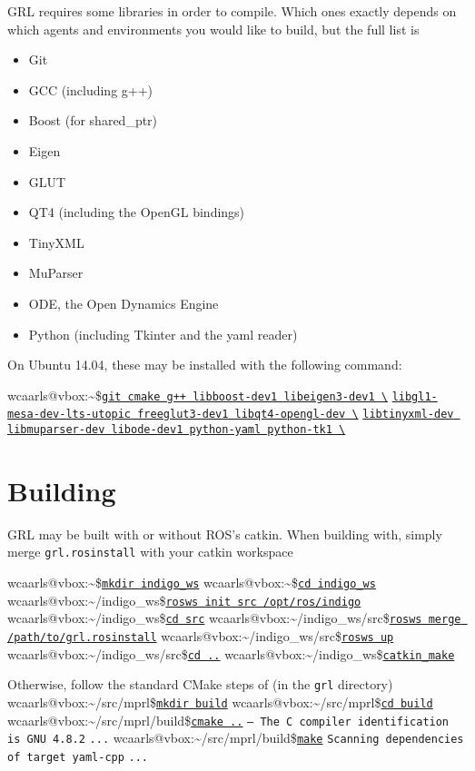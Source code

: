 \documentclass{article}
\makeatletter
\newcommand{\inp}[1]{\texttt{\underline{#1}}}
\newcommand{\txt}[1]{\texttt{#1}}
\newcommand{\promptm}{wcaarls@vbox:\~{}/src/mprl\$\xspace}
\newcommand{\promptmb}{wcaarls@vbox:\~{}/src/mprl/build\$\xspace}
\newcommand{\prompt}{wcaarls@vbox:\~{}\$\xspace}
\newcommand{\prompth}{wcaarls@vbox:\~{}/indigo\_ws\$\xspace}
\newcommand{\prompths}{wcaarls@vbox:\~{}/indigo\_ws/src\$\xspace}
\newenvironment{code}{\alltt}{\endalltt}
\makeatother
\begin{document}
GRL requires some libraries in order to compile. Which ones exactly depends
on which agents and environments you would like to build, but the full list
is

\begin{itemize}
  \item Git
  \item GCC (including g++)
  \item Boost (for shared\_ptr)
  \item Eigen
  \item GLUT
  \item QT4 (including the OpenGL bindings)
  \item TinyXML
  \item MuParser
  \item ODE, the Open Dynamics Engine
  \item Python (including Tkinter and the yaml reader)
\end{itemize}

On Ubuntu 14.04, these may be installed with the following command:

\begin{code}
\prompt \inp{git cmake g++ libboost-dev1 libeigen3-dev1 \textbackslash}
\inp{libgl1-mesa-dev-lts-utopic freeglut3-dev1 libqt4-opengl-dev \textbackslash}
\inp{libtinyxml-dev libmuparser-dev libode-dev1 python-yaml python-tk1 \textbackslash}
\end{code}

\section{Building}

GRL may be built with or without ROS's catkin. When building with, simply
merge \txt{grl.rosinstall} with your catkin workspace

\begin{code}
{\color{Gray}\prompt \inp{mkdir indigo\_ws}
\prompt \inp{cd indigo\_ws}
\prompth \inp{rosws init src /opt/ros/indigo}
\prompth \inp{cd src}}
\prompths \inp{rosws merge /path/to/grl.rosinstall} 
\prompths \inp{rosws up}
\prompths \inp{cd ..}
\prompth \inp{catkin\_make}
\end{code}

Otherwise, follow the standard CMake steps of (in the \txt{grl} directory)
\begin{code}
\promptm \inp{mkdir build}
\promptm \inp{cd build}
\promptmb \inp{cmake ..}
\txt{-- The C compiler identification is GNU 4.8.2}
\txt{...}
\promptmb \inp{make}
\txt{Scanning dependencies of target yaml-cpp}
\txt{...}
\end{code}
\end{document}
